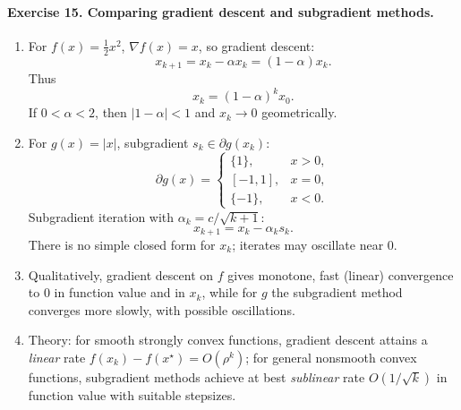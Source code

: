 \documentclass[11pt]{article}
\begin{document}
\bigskip

\paragraph{Exercise 15. Comparing gradient descent and subgradient methods.}

\begin{enumerate}
\item For $f(x)=\tfrac12x^2$, $\nabla f(x)=x$, so gradient descent:
\[
x_{k+1}=x_k-\alpha x_k=(1-\alpha)x_k.
\]
Thus
\[
x_k = (1-\alpha)^k x_0.
\]
If $0<\alpha<2$, then $|1-\alpha|<1$ and $x_k\to 0$ geometrically.

\item For $g(x)=|x|$, subgradient $s_k\in\partial g(x_k)$:
\[
\partial g(x) =
\begin{cases}
\{1\}, & x>0,\\
[-1,1], & x=0,\\
\{-1\}, & x<0.
\end{cases}
\]
Subgradient iteration with $\alpha_k = c/\sqrt{k+1}$:
\[
x_{k+1} = x_k - \alpha_k s_k.
\]
There is no simple closed form for $x_k$; iterates may oscillate near $0$.

\item Qualitatively, gradient descent on $f$ gives monotone, fast (linear) convergence to $0$ in function value and in $x_k$, while for $g$ the subgradient method converges more slowly, with possible oscillations.

\item Theory: for smooth strongly convex functions, gradient descent attains a \emph{linear} rate $f(x_k)-f(x^\star)=O(\rho^k)$; for general nonsmooth convex functions, subgradient methods achieve at best \emph{sublinear} rate $O(1/\sqrt{k})$ in function value with suitable stepsizes.
\end{enumerate}
\end{document}
